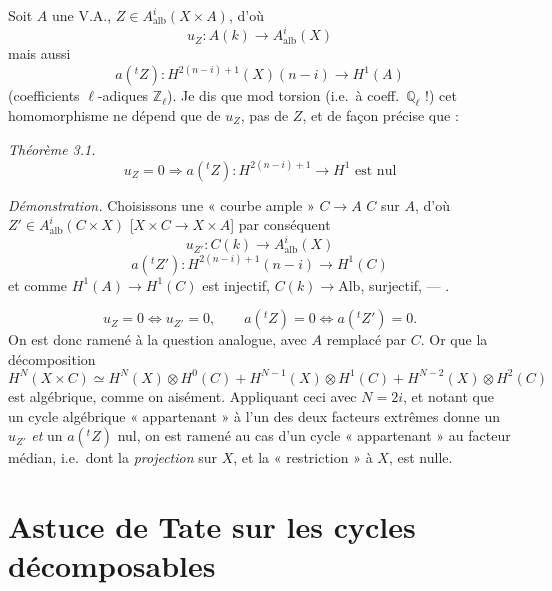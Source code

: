 \documentclass[11pt,a4paper]{article}
\begin{document}
Soit $A$ une V.A., $Z \in A^{i}_{\mathrm{alb}}(X \times A)$, d'où
\[
  u_{Z} : A(k) \longrightarrow A^{i}_{\mathrm{alb}}(X)
\]
mais aussi
\[
  a({}^{t}Z) : H^{2(n-i)+1}(X)(n-i) \longrightarrow H^{1}(A)
\]
(coefficients $\ell$-adiques \struck{\ill{}} $\mathbb{Z}_{\ell}$). Je dis que
mod torsion (i.e.\ à coeff.\ $\mathbb{Q}_{\ell}$ !) cet homomorphisme ne
dépend que de $u_{Z}$, pas de $Z$,  et de façon précise que :

\emph{Théorème 3.1.}
\[
  u_{Z} = 0 \Longrightarrow a({}^{t}Z) : H^{2(n-i)+1} \to H^{1} \text{ est
  nul}
\]

\emph{Démonstration.} Choisissons une « courbe ample » $C \to A$
\ill{} $C$ sur $A$,  d'où $Z' \in
A^{i}_{\mathrm{alb}}(C \times X)$ 
[$X \times C \to X \times A$]  par conséquent
\[
  u_{Z'} : C(k) \longrightarrow A^{i}_{\mathrm{alb}}(X)
\]
\[
  a({}^{t}Z') : H^{2(n-i)+1}(n-i) \longrightarrow H^{1}(C)
\]
et comme $H^{1}(A) \to H^{1}(C)$ est injectif, $C(k) \to \mathrm{Alb}$,
surjectif, — .

\[
  u_{Z} = 0 \Longleftrightarrow u_{Z'} = 0, \qquad a({}^{t}Z) = 0
  \Longleftrightarrow a({}^{t}Z') = 0 .
\]
On est donc ramené à la question analogue, avec $A$ remplacé par $C$. Or
  que la décomposition
\[
  H^{N}(X \times C) \simeq H^{N}(X) \otimes H^{0}(C) + H^{N-1}(X) \otimes
  H^{1}(C) + H^{N-2}(X) \otimes H^{2}(C)
\]
est algébrique, comme \ill{} on  aisément. Appliquant ceci
avec $N = 2i$, et notant que un cycle algébrique « appartenant » à l'un des
deux facteurs extrêmes donne un $u_{Z'}$ \emph{et} un $a({}^{t}Z)$ nul, on est
ramené au cas d'un cycle « appartenant » au facteur médian, i.e.\ dont la
\emph{projection} sur $X$, et la « restriction » à $X$, est nulle.

\section{Astuce de Tate sur les cycles décomposables}

\end{document}
